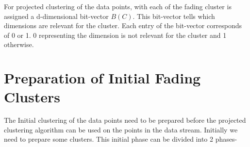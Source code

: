\documentclass[a4paper,12bp]{report}
\begin{document}
For projected clustering of the data points, with each of the fading cluster is assigned a d-dimensional bit-vector $B(C)$. This bit-vector tells which dimensions are relevant for the cluster. Each entry of the bit-vector corresponds of 0 or 1. 0 representing the dimension is not relevant for the cluster and 1 otherwise. 

\section{Preparation of Initial Fading Clusters}
\label{sec:initial_fc}
The Initial clustering of the data points need to be prepared before the projected clustering algorithm can be used on the points in the data stream. Initially we need to prepare some clusters. This initial phase can be divided into 2 phases-
\end{document}
